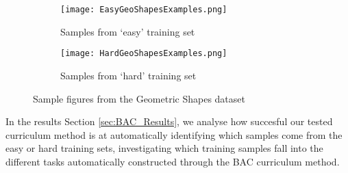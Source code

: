 \begin{figure}
\hspace*{-2cm}    
\centering
\begin{subfigure}{.6\textwidth}
  \centering
  \texttt{[image: EasyGeoShapesExamples.png]}
  \caption{Samples from `easy' training set}
  \label{fig:EasyGeoSamples}
\end{subfigure}%
\begin{subfigure}{.6\textwidth}
  \centering
  \texttt{[image: HardGeoShapesExamples.png]}
  \caption{Samples from `hard' training set}
  \label{fig:HardGeoSamples}
\end{subfigure}
\caption{Sample figures from the Geometric Shapes dataset}
\label{fig:GeoSamples}
\end{figure}

 In the results Section \ref{sec:BAC_Results}, we analyse how succesful our tested curriculum method is at automatically identifying which samples come from the easy or hard training sets, investigating which training samples fall into the different tasks automatically constructed through the BAC curriculum method. 

